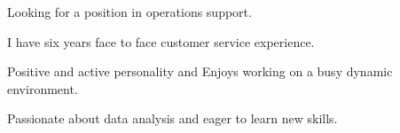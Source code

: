 

\begin{cventries}

  \cventry
    {} %
    {} %
    {} %
    {} %
    {
      \begin{cvitems} %
      \item Looking for a position in operations support.
      \item I have six years face to face customer service experience.
      \item Positive and active personality and Enjoys working on a busy dynamic environment.
      \item Passionate about data analysis and eager to learn new skills.
      \end{cvitems}
    }


\end{cventries}

